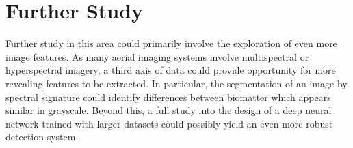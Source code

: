 \section{Further Study}
Further study in this area could primarily involve the exploration of even more image features.
As many aerial imaging systems involve multispectral or hyperspectral imagery, a third axis of data could provide opportunity for more revealing features to be extracted.
In particular, the segmentation of an image by spectral signature could identify differences between biomatter which appears similar in grayscale.
Beyond this, a full study into the design of a deep neural network trained with larger datasets could possibly yield an even more robust detection system.


